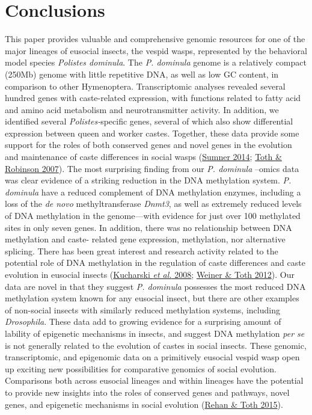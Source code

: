 \section{Conclusions}

This paper provides valuable and comprehensive genomic resources for one
of the major lineages of eusocial insects, the vespid wasps, represented
by the behavioral model species \textit{Polistes dominula}. The \textit{P.
dominula} genome is a relatively compact (250Mb) genome with little
repetitive DNA, as well as low GC content, in comparison to other
Hymenoptera. Transcriptomic analyses revealed several hundred genes with
caste-related expression, with functions related to fatty acid and amino
acid metabolism and neurotransmitter activity. In addition, we
identified several \textit{Polistes-}specific genes, several of which also
show differential expression between queen and worker castes. Together,
these data provide some support for the roles of both conserved genes
and novel genes in the evolution and maintenance of caste differences in
social wasps (\protect\hyperlink{ux5fENREFux5f58}{Sumner 2014};
\protect\hyperlink{ux5fENREFux5f61}{Toth \& Robinson 2007}). The most
surprising finding from our \textit{P. dominula} --omics data was clear
evidence of a striking reduction in the DNA methylation system. \textit{P.
dominula} have a reduced complement of DNA methylation enzymes,
including a loss of the \textit{de novo} methyltransferase \textit{Dnmt3},
as well as extremely reduced levels of DNA methylation in the
genome---with evidence for just over 100 methylated sites in only seven
genes. In addition, there was no relationship between DNA methylation
and caste- related gene expression, methylation, nor alternative
splicing. There has been great interest and research activity related to
the potential role of DNA methylation in the regulation of caste
differences and caste evolution in eusocial insects
(\protect\hyperlink{ux5fENREFux5f28}{Kucharski \textit{et al.} 2008};
\protect\hyperlink{ux5fENREFux5f68}{Weiner \& Toth 2012}). Our data are
novel in that they suggest \textit{P. dominula} possesses the most reduced
DNA methylation system known for any eusocial insect, but there are
other examples of non-social insects with similarly reduced methylation
systems, including \textit{Drosophila}. These data add to growing evidence
for a surprising amount of lability of epigenetic mechanisms in insects,
and suggest DNA methylation \textit{per se} is not generally related to
the evolution of castes in social insects. These genomic,
transcriptomic, and epigenomic data on a primitively eusocial vespid
wasp open up exciting new possibilities for comparative genomics of
social evolution. Comparisons both across eusocial lineages and within
lineages have the potential to provide new insights into the roles of
conserved genes and pathways, novel genes, and epigenetic mechanisms in
social evolution (\protect\hyperlink{ux5fENREFux5f47}{Rehan \& Toth
2015}).


